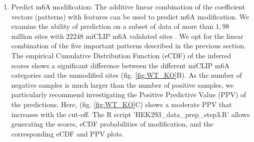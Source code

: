 \documentclass[times, 11pt, a4paper]{article}
\begin{document}
\begin{enumerate}
\item Predict m6A modification: The additive linear combination of the coefficient vectors (patterns) with features can be used to predict m6A modification. We examine the ability of prediction on a subset of data of more than $1,98$ million sites with $22248$ miCLIP m6A validated sites {}. We opt for the linear combination of the five important patterns described in the previous section. The empirical Cumulative Distribution Function (eCDF) of the inferred scores shows a significant difference between the different miCLIP m6A categories and the unmodified sites (fig. \ref{fig:WT_KO}B). As the number of negative samples is much larger than the number of positive samples, we particularly recommend investigating the Positive Predictive Value (PPV) of the predictions. Here, (fig. \ref{fig:WT_KO}C) shows a moderate PPV that increases with the cut-off.  The R script 'HEK293\_data\_prep\_step3.R' allows generating the scores, eCDF probabilities of modification, and the corresponding eCDF and PPV plots.
	
\end{enumerate}
\end{document}
